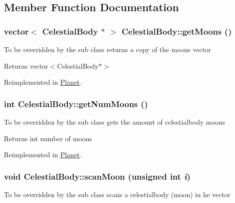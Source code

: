 \subsection{Member Function Documentation}
\hypertarget{classCelestialBody_a6c9db5c520596bc85a2e2a461db4b2c8}{
\subsubsection[{getMoons}]{\setlength{\rightskip}{0pt plus 5cm}vector$<$ {\bf CelestialBody} $\ast$ $>$ CelestialBody::getMoons ()}}
\label{d4/d0b/classCelestialBody_a6c9db5c520596bc85a2e2a461db4b2c8}
To be overridden by the sub class returns a copy of the moons vector

\begin{DoxyReturn}{Returns}
vector$<$CelestialBody$\ast$$>$ 
\end{DoxyReturn}


Reimplemented in \hyperlink{classPlanet_ac003f70ce4149dc5d87423dace7de0b1}{Planet}.

\hypertarget{classCelestialBody_ae41a354c4b3345c7558c9691bc7c239e}{
\subsubsection[{getNumMoons}]{\setlength{\rightskip}{0pt plus 5cm}int CelestialBody::getNumMoons ()}}
\label{d4/d0b/classCelestialBody_ae41a354c4b3345c7558c9691bc7c239e}
To be overridden by the sub class gets the amount of celestialbody moons

\begin{DoxyReturn}{Returns}
int number of moons 
\end{DoxyReturn}


Reimplemented in \hyperlink{classPlanet_a4c5cc040f92ec9fde52a4cccd04b69ff}{Planet}.

\hypertarget{classCelestialBody_a6e7b86fa71d74ad29e2434c4715b5608}{
\subsubsection[{scanMoon}]{\setlength{\rightskip}{0pt plus 5cm}void CelestialBody::scanMoon (unsigned int {\em i})}}
\label{d4/d0b/classCelestialBody_a6e7b86fa71d74ad29e2434c4715b5608}
To be overridden by the sub class scans a celestialbody (moon) in he vector


